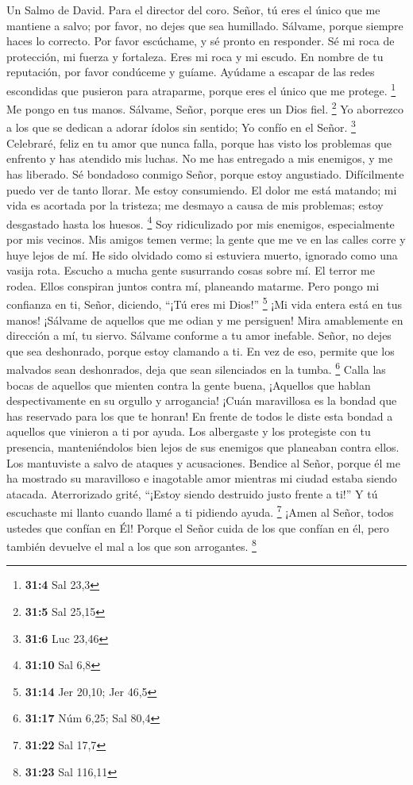 Un Salmo de David. Para el director del coro.  Señor, tú
eres el único que me mantiene a salvo; por favor, no dejes que sea
humillado. Sálvame, porque siempre haces lo correcto.  Por
favor escúchame, y sé pronto en responder. Sé mi roca de protección, mi
fuerza y fortaleza.  Eres mi roca y mi escudo. En nombre de
tu reputación, por favor condúceme y guíame.  Ayúdame a
escapar de las redes escondidas que pusieron para atraparme, porque eres
el único que me protege. \footnote{\textbf{31:4} Sal 23,3} 
Me pongo en tus manos. Sálvame, Señor, porque eres un Dios fiel.
\footnote{\textbf{31:5} Sal 25,15}  Yo aborrezco a los que
se dedican a adorar ídolos sin sentido; Yo confío en el Señor.
\footnote{\textbf{31:6} Luc 23,46}  Celebraré, feliz en tu
amor que nunca falla, porque has visto los problemas que enfrento y has
atendido mis luchas.  No me has entregado a mis enemigos, y
me has liberado.  Sé bondadoso conmigo Señor, porque estoy
angustiado. Difícilmente puedo ver de tanto llorar. Me estoy
consumiendo.  El dolor me está matando; mi vida es acortada
por la tristeza; me desmayo a causa de mis problemas; estoy desgastado
hasta los huesos. \footnote{\textbf{31:10} Sal 6,8}  Soy
ridiculizado por mis enemigos, especialmente por mis vecinos. Mis amigos
temen verme; la gente que me ve en las calles corre y huye lejos de mí.
 He sido olvidado como si estuviera muerto, ignorado como
una vasija rota.  Escucho a mucha gente susurrando cosas
sobre mí. El terror me rodea. Ellos conspiran juntos contra mí,
planeando matarme.  Pero pongo mi confianza en ti, Señor,
diciendo, ``¡Tú eres mi Dios!'' \footnote{\textbf{31:14} Jer 20,10; Jer
  46,5}  ¡Mi vida entera está en tus manos! ¡Sálvame de
aquellos que me odian y me persiguen!  Mira amablemente en
dirección a mí, tu siervo. Sálvame conforme a tu amor inefable.
 Señor, no dejes que sea deshonrado, porque estoy clamando
a ti. En vez de eso, permite que los malvados sean deshonrados, deja que
sean silenciados en la tumba. \footnote{\textbf{31:17} Núm 6,25; Sal
  80,4}  Calla las bocas de aquellos que mienten contra la
gente buena, ¡Aquellos que hablan despectivamente en su orgullo y
arrogancia!  ¡Cuán maravillosa es la bondad que has
reservado para los que te honran! En frente de todos le diste esta
bondad a aquellos que vinieron a ti por ayuda.  Los
albergaste y los protegiste con tu presencia, manteniéndolos bien lejos
de sus enemigos que planeaban contra ellos. Los mantuviste a salvo de
ataques y acusaciones.  Bendice al Señor, porque él me ha
mostrado su maravilloso e inagotable amor mientras mi ciudad estaba
siendo atacada.  Aterrorizado grité, ``¡Estoy siendo
destruido justo frente a ti!'' Y tú escuchaste mi llanto cuando llamé a
ti pidiendo ayuda. \footnote{\textbf{31:22} Sal 17,7} 
¡Amen al Señor, todos ustedes que confían en Él! Porque el Señor cuida
de los que confían en él, pero también devuelve el mal a los que son
arrogantes. \footnote{\textbf{31:23} Sal 116,11}


